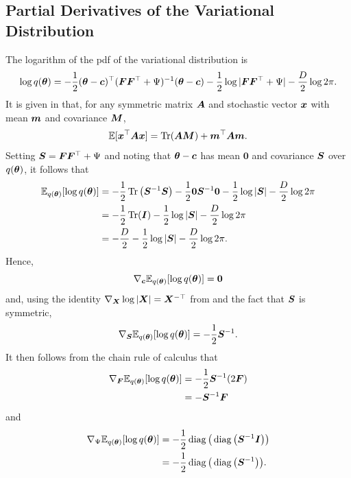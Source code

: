 \documentclass[10pt]{article} %
\newcommand{\tr}{\mathop{\mathrm{Tr}}}
\newcommand{\diag}{\mathop{\mathrm{diag}}}
\begin{document}
\subsection{Partial Derivatives of the Variational Distribution}

The logarithm of the pdf of the variational distribution is
\begin{equation}
    \log q({\bm{\theta}}) = -\frac{1}{2} ({\bm{\theta}} - {\bm{c}})^\top ({\bm{F}} {\bm{F}}^{\top} + \Psi)^{-1} ({\bm{\theta}} - {\bm{c}}) - \frac{1}{2} \log |{\bm{F}} {\bm{F}}^{\top} + \Psi| 
    - \frac{D}{2} \log 2\pi.
\end{equation}
It is given in \citep{petersen2012} that, for any symmetric matrix ${\bm{A}}$ and stochastic vector ${\bm{x}}$ with mean ${\bm{m}}$ and covariance ${\bm{M}}$,
\begin{equation}\label{eqn:expectation_xTAx}
\E [\vx^\top \mA \vx] = \tr(\mA \mM) + \vm^\top \mA \vm.
\end{equation}
Setting ${\bm{S}} = {\bm{F}} {\bm{F}}^{\top} + \Psi$ and noting that ${\bm{\theta}} - {\bm{c}}$ has mean $\bm{0}$ and covariance ${\bm{S}}$ over $q({\bm{\theta}})$, it follows that
\begin{align}
\begin{split}\label{eqn:expectation_of_vi_dist}
	\E_{q(\vtheta)}[\log q(\vtheta)]
	& = -\frac{1}{2} \tr\big(\mS^{-1} \mS \big) -\frac{1}{2} \bm{0} \mS^{-1} \bm{0} 
	- \frac{1}{2} \log |\mS| - \frac{D}{2} \log 2\pi \\
	& = -\frac{1}{2}\tr(\mI) - \frac{1}{2} \log |\mS| - \frac{D}{2} \log 2\pi \\
	& = -\frac{D}{2}  - \frac{1}{2} \log |\mS| - \frac{D}{2} \log 2\pi.
\end{split}
\end{align}
Hence, 
\begin{equation}
	\nabla_{\bm{c}} \mathbb{E}_{q({\bm{\theta}})} [\log q({\bm{\theta}})] = \bm{0}
\end{equation}
and, using the identity $\nabla_{\bm{X}} \log |{\bm{X}}| = {\bm{X}}^{-\top}$ from \citep{petersen2012} and the fact that ${\bm{S}}$ is symmetric,
\begin{equation}
	\nabla_{\bm{S}} \mathbb{E}_{q({\bm{\theta}})} [\log q({\bm{\theta}})] = -\frac{1}{2} {\bm{S}}^{-1}.
\end{equation}
It then follows from the chain rule of calculus that
\begin{align}
\begin{split}\label{eqn:grad_vi_dist_wrt_F}
	\nabla_{\bm{F}} \mathbb{E}_{q({\bm{\theta}})} [\log q({\bm{\theta}})]
	& = -\frac{1}{2} {\bm{S}}^{-1} (2{\bm{F}}) \\
	& = -{\bm{S}}^{-1}{\bm{F}}
\end{split}
\end{align}
and
\begin{align}
\begin{split}\label{eqn:grad_vi_dist_wrt_Psi}
	\nabla_\Psi \E_{q(\vtheta)} [\log q(\vtheta)]
	& = -\frac{1}{2} \diag\big(\diag\big(\mS^{-1} \mI\big)\big) \\
	& = -\frac{1}{2} \diag\big(\diag\big(\mS^{-1}\big)\big).
\end{split}
\end{align}
\end{document}
